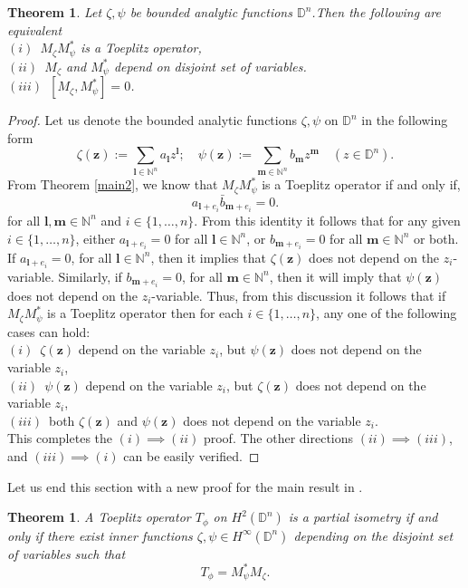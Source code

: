 \documentclass[12pt]{amsart}
\newtheorem{thm}[propn]{Theorem}
\theoremstyle{definition}
\newcommand{\Nat}{\mathbb{N}}
\newcommand{\D}{\mathbb{D}}
\newcommand{\1}{{\mbox{\bf 1}}}
\begin{document}
\begin{thm}\label{comcondn}
Let $\zeta, \psi$ be bounded analytic functions $\D^n$.Then the following are equivalent\\
$(i)$~$M_{\zeta}M_{\psi}^*$ is a Toeplitz operator,\\
$(ii)$~$M_{\zeta}$ and $M_{\psi}^*$ depend on disjoint set of variables.\\
$(iii)$~$[M_{\zeta},M_{\psi}^*]=0$.
\end{thm}
\begin{proof}
Let us denote the bounded analytic functions $\zeta, \psi$ on $\D^n$ in the following form
\[
\zeta(\bm{z}):= \sum_{\bm{l} \in \Nat^n} a_{\bm{l}} z^{\bm{l}}  ; \quad \psi(\bm{z}):= \sum_{\bm{m} \in \Nat^n} b_{\bm{m}} z^{\bm{m}} \quad (z \in \D^n).
\]
From Theorem \ref{main2}, we know that $M_{\zeta}M_{\psi}^*$ is a Toeplitz operator if and only if,
\[
a_{\bm{l}+ e_i} \bar{b}_{\bm{m}+ e_i} = 0.
\]
for all $\bm{l}, \bm{m} \in \Nat^n$ and $i \in \{1,\ldots,n\}$. From this identity it follows that for any given $i \in \{1,\ldots,n\}$, either $a_{\bm{l}+ e_i} =0$ for all $\bm{l} \in \Nat^n$, or $b_{\bm{m}+ e_i} = 0$ for all $\bm{m} \in \Nat^n$ or both.  If $a_{\bm{l}+ e_i} =0$, for all $\bm{l} \in \Nat^n$, then it implies that $\zeta(\bm{z})$ does not depend on the $z_i$-variable. Similarly, if $b_{\bm{m}+ e_i} =0$, for all $\bm{m} \in \Nat^n$, then it will imply that $\psi(\bm{z})$ does not depend on the $z_i$-variable. Thus, from this discussion it follows that if $M_{\zeta}M_{\psi}^*$ is a Toeplitz operator then for each $i \in \{1,\ldots,n\}$,  any one of the following cases can hold:\\
$(i)$~$\zeta(\bm{z})$ depend on the variable $z_i$, but $\psi(\bm{z})$ does not depend on the variable $z_i$,\\
$(ii)$~$\psi(\bm{z})$ depend on the variable $z_i$, but $\zeta(\bm{z})$ does not depend on the variable $z_i$,\\
$(iii)$~both $\zeta(\bm{z})$ and $\psi(\bm{z})$ does not depend on the variable $z_i$.\\
This completes the $(i) \implies (ii)$ proof.  The other directions $(ii) \implies (iii)$, and $(iii) \implies (i)$ can be easily verified.
\end{proof}
Let us end this section with a new proof for the main result in \cite[Theorem 1.1]{KPS}.
\begin{thm}
A Toeplitz operator $T_{\phi}$ on $H^2(\D^n)$ is a partial isometry if and only if there exist inner functions $\zeta, \psi \in H^{\infty}(\D^n)$ depending on the disjoint set of variables such that 
\[
T_{\phi} = M_{\psi}^* M_{\zeta}.
\]
\end{thm}
\end{document}
